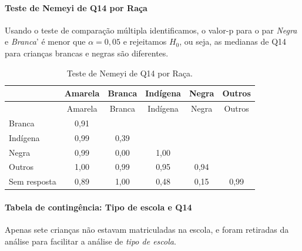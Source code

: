 \documentclass[]{article}
\let\oldparagraph\paragraph
\renewcommand{\paragraph}[1]{\oldparagraph{#1}\mbox{}}
\begin{document}
\hypertarget{teste-de-nemeyi-de-q14-por-rauxe7a}{%
\paragraph{Teste de Nemeyi de Q14 por Raça}\label{teste-de-nemeyi-de-q14-por-rauxe7a}}

Usando o teste de comparação múltipla identificamos, o valor-p para o par \emph{Negra} e \emph{Branca}' é menor que \(\alpha=0,05\) e rejeitamos \(H_0\), ou seja, as medianas de Q14 para crianças brancas e negras são diferentes.

\begin{longtable}[]{@{}lccccc@{}}
\caption{\label{tab:unnamed-chunk-87}Teste de Nemeyi de Q14 por Raça.}\tabularnewline
\toprule
& Amarela & Branca & Indígena & Negra & Outros\tabularnewline
\midrule
\endfirsthead
\toprule
& Amarela & Branca & Indígena & Negra & Outros\tabularnewline
\midrule
\endhead
Branca & 0,91 & & & &\tabularnewline
Indígena & 0,99 & 0,39 & & &\tabularnewline
Negra & 0,99 & 0,00 & 1,00 & &\tabularnewline
Outros & 1,00 & 0,99 & 0,95 & 0,94 &\tabularnewline
Sem resposta & 0,89 & 1,00 & 0,48 & 0,15 & 0,99\tabularnewline
\bottomrule
\end{longtable}

\cleardoublepage

\hypertarget{tabela-de-continguxeancia-tipo-de-escola-e-q14}{%
\paragraph{Tabela de contingência: Tipo de escola e Q14}\label{tabela-de-continguxeancia-tipo-de-escola-e-q14}}

Apenas sete crianças não estavam matriculadas na escola, e foram retiradas da análise para facilitar a análise de \emph{tipo de escola}.
\end{document}
